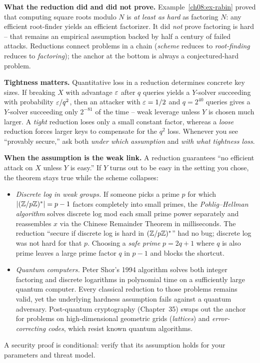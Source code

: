 \begin{whybox}
\textbf{What the reduction did and did not prove.} Example~\ref{ch08:ex-rabin} proved that computing square roots modulo $N$ is \emph{at least as hard} as factoring $N$: any efficient root-finder yields an efficient factorizer. It did \emph{not} prove factoring is hard -- that remains an empirical assumption backed by half a century of failed attacks. Reductions connect problems in a chain (\emph{scheme} reduces to \emph{root-finding} reduces to \emph{factoring}); the anchor at the bottom is always a conjectured-hard problem.
\end{whybox}

\begin{focusbox}
\textbf{Tightness matters.} Quantitative loss in a reduction determines concrete key sizes. If breaking $X$ with advantage $\varepsilon$ after $q$ queries yields a $Y$-solver succeeding with probability $\varepsilon/q^{2}$, then an attacker with $\varepsilon = 1/2$ and $q = 2^{40}$ queries gives a $Y$-solver succeeding only $2^{-81}$ of the time -- weak leverage unless $Y$ is chosen much larger. A \emph{tight} reduction loses only a small constant factor, whereas a \emph{loose} reduction forces larger keys to compensate for the $q^2$ loss. Whenever you see ``provably secure,'' ask both \emph{under which assumption} and \emph{with what tightness loss}.
\end{focusbox}

\begin{attackbox}
\textbf{When the assumption is the weak link.} A reduction guarantees ``no efficient attack on $X$ unless $Y$ is easy.'' If $Y$ turns out to be easy in the setting you chose, the theorem stays true while the scheme collapses:
\begin{itemize}
\item \emph{Discrete log in weak groups.} If someone picks a prime $p$ for which $|(\mathbb{Z}/p\mathbb{Z})^{*}| = p - 1$ factors completely into small primes, the \emph{Pohlig--Hellman algorithm} solves discrete log mod each small prime power separately and reassembles $x$ via the Chinese Remainder Theorem in milliseconds. The reduction ``secure if discrete log is hard in $(\mathbb{Z}/p\mathbb{Z})^{*}$'' had no bug; discrete log was not hard for that $p$. Choosing a \emph{safe prime} $p = 2q + 1$ where $q$ is also prime leaves a large prime factor $q$ in $p - 1$ and blocks the shortcut.
\item \emph{Quantum computers.} Peter Shor's 1994 algorithm solves both integer factoring and discrete logarithms in polynomial time on a sufficiently large quantum computer. Every classical reduction to those problems remains valid, yet the underlying hardness assumption fails against a quantum adversary. Post-quantum cryptography (Chapter~35) swaps out the anchor for problems on high-dimensional geometric grids (\emph{lattices}) and \emph{error-correcting codes}, which resist known quantum algorithms.
\end{itemize}
A security proof is conditional: verify that its assumption holds for your parameters and threat model.
\end{attackbox}

